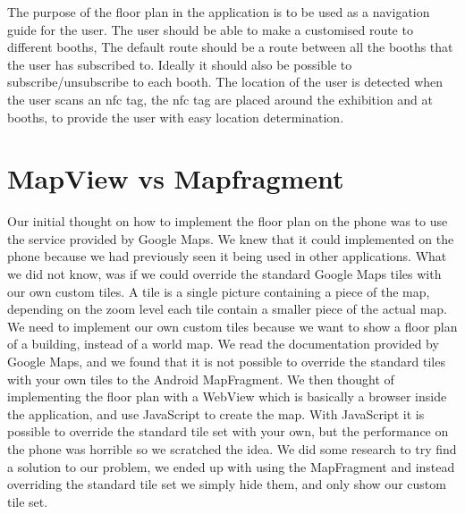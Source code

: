 The purpose of the floor plan in the application is to be used as a navigation guide for the user. The user should be able to make a customised route to different booths, The default route should be a route between all the booths that the user has subscribed to.
Ideally it should also be possible to subscribe/unsubscribe to each booth. The location of the user is detected when the user scans an \ac{nfc} tag, the \ac{nfc} tag are placed around the exhibition and at booths, to provide the user with easy location determination.

\section{MapView vs Mapfragment}
Our initial thought on how to implement the floor plan on the phone was to use the service provided by Google Maps. We knew that it could implemented on the phone because we had previously seen it being used in other applications. What we did not know, was if we could override the standard Google Maps tiles with our own custom tiles. A tile is a single picture containing a piece of the map, depending on the zoom level each tile contain a smaller piece of the actual map.\\
We need to implement our own custom tiles because we want to show a floor plan of a building, instead of a world map. We read the documentation provided by Google Maps, and we found that it is not possible to override the standard tiles with your own tiles to the Android MapFragment. We then thought of implementing the floor plan with a WebView which is basically a browser inside the application, and use JavaScript to create the map. With JavaScript it is possible to override the standard tile set with your own, but the performance on the phone was horrible so we scratched the idea.
We did some research to try find a solution to our problem, we ended up with using the MapFragment and instead overriding the standard tile set we simply hide them, and only show our custom tile set.

